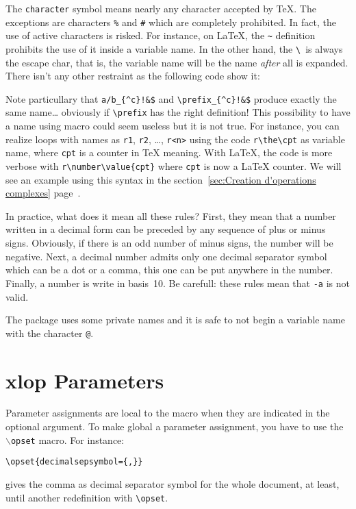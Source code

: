 \documentclass[12pt]{report}
\makeatletter
\newcommand*\boi{\textbackslash}
\newcommand\package[1]{\textsf{#1}}
\newcommand\macro[1]{\texttt{$\backslash$#1}\index{#1@\texttt{\boi {#1}}}}
\makeatother
\begin{document}
The \texttt{character} symbol means nearly any character accepted by
\TeX{}. The exceptions are characters \verb+%+ and \verb+#+ which are
completely prohibited. In fact, the use of active characters is
risked. For instance, on \LaTeX{}, the \verb+~+ definition prohibits the
use of it inside a variable name. In the other hand, the \verb+\ +is
always the escape char, that is, the variable name will be the name
\emph{after} all is expanded. There isn't any other restraint as the
following code show it:
\begin{SideBySideExample}
  \newcommand\prefix{a/b}
  \opprint{\prefix_{^c}!&$}
\end{SideBySideExample}
%
Note particullary that \verb+a/b_{^c}!&$+ and \verb+\prefix_{^c}!&$+
produce exactly the same name\ldots{} obviously if \verb+\prefix+ has
the right definition! This possibility to have a name using macro
could seem useless but it is not true. For instance, you can realize
loops with names as \verb+r1+, \verb+r2+, \ldots,
\verb+r<n>+ using the code \verb+r\the\cpt+ as variable name, where
\verb+cpt+ is a counter in \TeX{} meaning. With \LaTeX{}, the code
is more verbose with \verb+r\number\value{cpt}+ where \verb+cpt+ is
now a \LaTeX{} counter. We will see an example using this syntax in
the section~\ref{sec:Creation d'operations complexes}
page~\pageref{sec:Creation d'operations complexes}.

In practice, what does it mean all these rules?
First, they mean that a number written in a decimal form can be
preceded by any sequence of plus or minus signs. Obviously, if there
is an odd number of minus signs, the number will be negative. Next, a
decimal number admits only one decimal separator symbol which can
be a dot or a comma, this one can be put anywhere in the
number. Finally, a number is write in basis~10. Be carefull: these
rules mean that  \verb+-a+ is not valid.

The package uses some private names and it is safe to not begin a
variable name with the character \texttt{@}.

\section{\package{xlop} Parameters}
\label{sec:Parametres de xlop}
Parameter assignments are local to the macro when they are indicated
in the optional argument. To make global a parameter assignment, you
have to use the \macro{opset} macro. For instance:
\begin{Verbatim}[xrightmargin=0pt]
  \opset{decimalsepsymbol={,}}
\end{Verbatim}
gives the comma as decimal separator symbol for the whole document, at
least, until another redefinition with \verb+\opset+.
\end{document}

